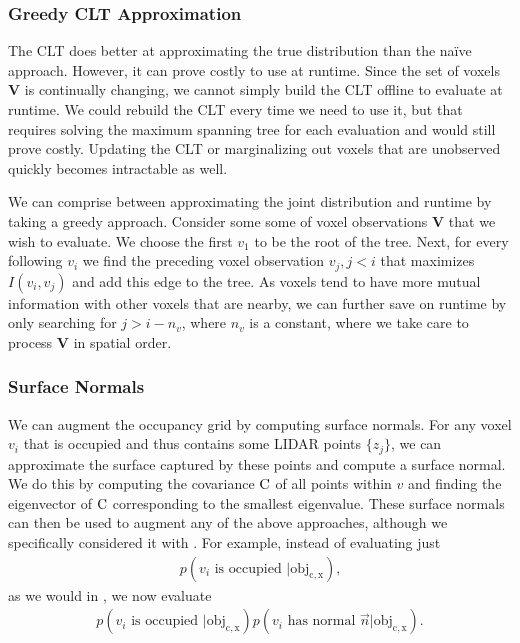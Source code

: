 \subsubsection{Greedy CLT Approximation} \label{sec:greedy_clt}

The \ac{CLT} does better at approximating the true distribution than the na\"ive
approach. However, it can prove costly to use at runtime. Since the set of
voxels $\mathbf{V}$ is continually changing, we cannot simply build the \ac{CLT}
offline to evaluate at runtime. We could rebuild the \ac{CLT} every time we need
to use it, but that requires solving the maximum spanning tree for each
evaluation and would still prove costly. Updating the \ac{CLT} or marginalizing
out voxels that are unobserved quickly becomes intractable as well.

We can comprise between approximating the joint distribution and runtime by
taking a greedy approach. Consider some some of voxel observations $\mathbf{V}$
that we wish to evaluate. We choose the first $v_1$ to be the root of the tree.
Next, for every following $v_i$ we find the preceding voxel observation $v_j, j
< i$ that maximizes $I(v_i, v_j)$ and add this edge to the tree. As voxels tend
to have more mutual information with other voxels that are nearby, we can
further save on runtime by only searching for $j > i - n_v$, where $n_v$ is a
constant, where we take care to process $\mathbf{V}$ in spatial order.

\subsubsection{Surface Normals} \label{sec:normals}

We can augment the occupancy grid by computing surface normals. For any voxel
$v_i$ that is occupied and thus contains some \ac{LIDAR} points $\{z_j\}$, we
can approximate the surface captured by these points and compute a surface
normal. We do this by computing the covariance $\mathrm{C}$ of all points within
$v$ and finding the eigenvector of $\mathrm{C}$ corresponding to the smallest
eigenvalue. These surface normals can then be used to augment
any of the above approaches, although we specifically considered it with
. For example, instead of evaluating just
%
\begin{align}
  p(v_i \text{ is occupied } | \mathrm{obj_{c,x}}) \text{,}
\end{align}
%
as we would in , we now evaluate
%
\begin{align}
  p(v_i \text{ is occupied } | \mathrm{obj_{c,x}}) p(v_i \text{ has normal } \vec{n}
  | \mathrm{obj_{c, x}}) \text{.}
\end{align}

